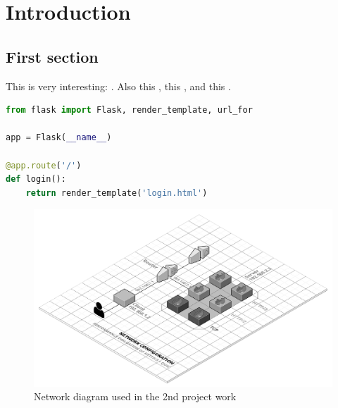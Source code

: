 \chapter{Introduction}

\lipsum[3]

\section{First section}

This is very interesting: \cite{coulouris}. Also this \cite{donoho}, this \cite{ictbusiness}, and this \cite{dalal}.

\begin{code}[Implementation]
    \begin{lstlisting}[language=Python]
from flask import Flask, render_template, url_for

app = Flask(__name__)

@app.route('/')
def login():
    return render_template('login.html')
    \end{lstlisting}
\end{code}

\begin{figure}
    \centering
    \includegraphics[scale=0.25]{figures/DNCS-2.png}
    \caption{Network diagram used in the 2nd project work}
\end{figure}

\lipsum